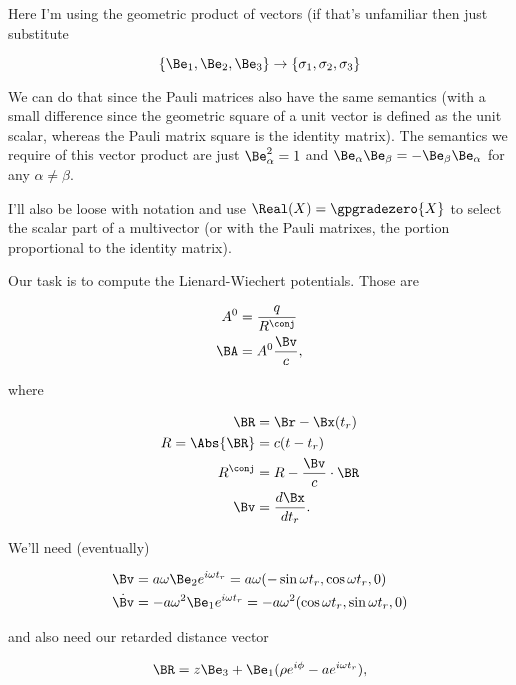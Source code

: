 Here I'm using the geometric product of vectors (if that's unfamiliar then just substitute

\begin{equation}\label{eqn:relativisticElectrodynamicsExamReflection:30}
\{\Be_1, \Be_2, \Be_3\} \rightarrow \{\sigma_1, \sigma_2, \sigma_3\}
\end{equation}

We can do that since the Pauli matrices also have the same semantics (with a small difference since the geometric square of a unit vector is defined as the unit scalar, whereas the Pauli matrix square is the identity matrix).  The semantics we require of this vector product are just $\Be_\alpha^2 = 1$ and $\Be_\alpha \Be_\beta = - \Be_\beta \Be_\alpha$ for any $\alpha \ne \beta$.

I'll also be loose with notation and use $\Real(X) = \gpgradezero{X}$ to select the scalar part of a multivector (or with the Pauli matrixes, the portion proportional to the identity matrix).

Our task is to compute the Lienard-Wiechert potentials.  Those are

\begin{align}\label{eqn:relativisticElectrodynamicsExamReflection:50}
A^0 &= \frac{q}{R^\conj} \\
\BA &= A^0 \frac{\Bv}{c},
\end{align}

where

\begin{align}\label{eqn:relativisticElectrodynamicsExamReflection:70}
\BR &= \Br - \Bx(t_r) \\
R = \Abs{\BR} &= c (t - t_r) \\
R^\conj &= R - \frac{\Bv}{c} \cdot \BR \\
\Bv &= \frac{d\Bx}{dt_r}.
\end{align}

We'll need (eventually)

\begin{align}\label{eqn:relativisticElectrodynamicsExamReflection:90}
\Bv &= a \omega \Be_2 e^{i \omega t_r} = a \omega ( -\sin \omega t_r, \cos\omega t_r, 0) \\
\dot{\Bv} &= -a \omega^2 \Be_1 e^{i \omega t_r} = 
-a \omega^2 (\cos\omega t_r, \sin\omega t_r, 0)
\end{align}

and also need our retarded distance vector

\begin{equation}\label{eqn:relativisticElectrodynamicsExamReflection:110}
\BR = z \Be_3 + \Be_1 (\rho e^{i \phi} - a e^{i \omega t_r} ),
\end{equation}

